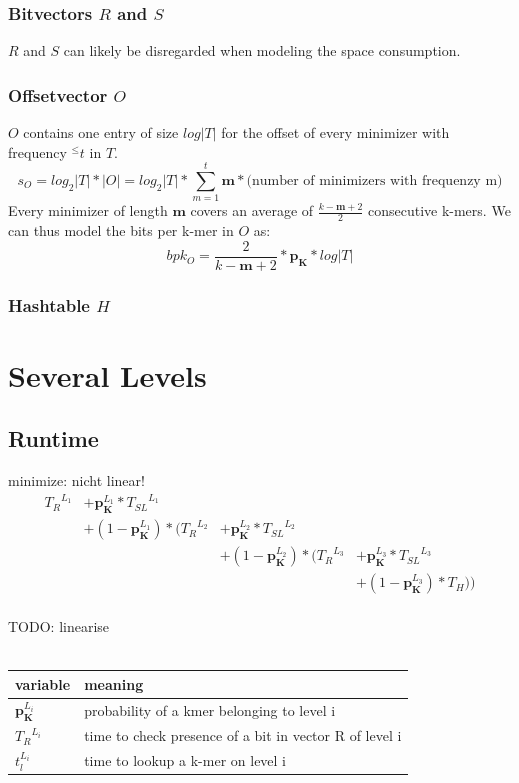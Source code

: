 \documentclass{article}
\newcommand{\timeForCheckInR}{{T_R}}
\newcommand{\timeForLookupInS}{{T_{SL}}}
\newcommand{\timeForHashtable}{{T_H}}
\newcommand{\percKmers}{\textbf{p}_\textbf{K}}
\newcommand{\minimizerLength}{\textbf{m}}
\newcommand{\levelI}{{L_i}}
\newcommand{\levelOne}{{L_1}}
\newcommand{\levelTwo}{{L_2}}
\newcommand{\levelThree}{{L_3}}
\begin{document}
\subsubsection*{Bitvectors $R$ and $S$}
$R$ and $S$ can likely be disregarded when modeling the space consumption. 

\subsubsection*{Offsetvector $O$}
$O$ contains one entry of size $log |T|$ for the offset of every minimizer with frequency $^\leq t$ in $T$.\\
\[s_O = log_2|T| * |O| = log_2|T| * \sum_{m=1}^{t} \minimizerLength * \text{(number of minimizers with frequenzy m)} \]
Every minimizer of length $\minimizerLength$ covers an average of $\frac{k-\minimizerLength+2}{2}$ consecutive k-mers. We can thus model the bits per k-mer in $O$ as:\\
\[bpk_O = \frac{2}{k-\minimizerLength+2} * \percKmers * log |T| \]

\subsubsection*{Hashtable $H$}


\newpage
\section*{Several Levels}
\subsection*{Runtime}
minimize: nicht linear!\\


\[
\begin{array}{llll}
	\timeForCheckInR^\levelOne 	&+ \percKmers^\levelOne*\timeForLookupInS^\levelOne 				&							&\\
			&+ (1-\percKmers^\levelOne) * \Bigg( \timeForCheckInR^\levelTwo &+ \percKmers^\levelTwo*\timeForLookupInS^\levelTwo 				&\\
			&							&+ (1-\percKmers^\levelTwo) * \Big( \timeForCheckInR^\levelThree	&+ \percKmers^\levelThree*\timeForLookupInS^\levelThree \\
			&							&							&+ (1-\percKmers^\levelThree) * \timeForHashtable \Big) \Bigg)
\end{array}
\]
\\
TODO: linearise
\\
\\
\begin{tabular}{ l | l }
	variable	& meaning \\
	\hline
	$\percKmers^\levelI$		& probability of a kmer belonging to level i \\
	$\timeForCheckInR^\levelI$		& time to check presence of a bit in vector R of level i \\
	$t_l^\levelI$		& time to lookup a k-mer on level i \\
\end{tabular}
\\
\\
\end{document}
